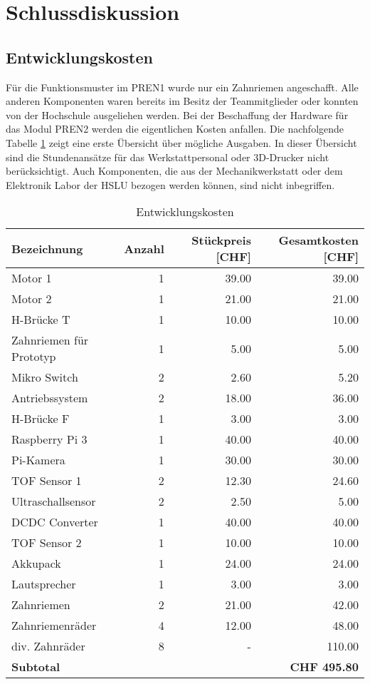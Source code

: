 \newpage
\section{Schlussdiskussion}
\subsection{Entwicklungskosten}
Für die Funktionsmuster im PREN1 wurde nur ein Zahnriemen angeschafft. Alle anderen Komponenten waren bereits im Besitz der Teammitglieder oder konnten von der Hochschule ausgeliehen werden. Bei der Beschaffung der Hardware für das Modul PREN2 werden die eigentlichen Kosten anfallen. Die nachfolgende Tabelle \ref{tab:kosten} zeigt eine erste Übersicht über mögliche Ausgaben. In dieser Übersicht sind die Stundenansätze für das Werkstattpersonal oder 3D-Drucker nicht berücksichtigt. Auch Komponenten, die aus der Mechanikwerkstatt oder dem Elektronik Labor der HSLU bezogen werden können, sind nicht inbegriffen.

\begin{center}
\centering
\begin{table}[H]
\begin{tabular}{|l|r|r|r|}
\hline 
\textbf{Bezeichnung} & \textbf{Anzahl} &
\textbf{Stückpreis [CHF]} & \textbf{Gesamtkosten [CHF]} \\
\hline 
Motor 1 & 1 & 39.00 & 39.00 \\
\hline
Motor 2 & 1 & 21.00 & 21.00 \\
\hline
H-Brücke T & 1 & 10.00 & 10.00\\
\hline
Zahnriemen für Prototyp & 1 & 5.00 & 5.00 \\
\hline
Mikro Switch & 2 & 2.60  & 5.20\\
\hline
Antriebssystem & 2 & 18.00  & 36.00\\
\hline
H-Brücke F & 1 & 3.00 & 3.00 \\
\hline
Raspberry Pi 3 & 1 & 40.00 & 40.00 \\
\hline
Pi-Kamera & 1 & 30.00 & 30.00 \\
\hline
TOF Sensor 1 & 2 & 12.30 & 24.60 \\
\hline
Ultraschallsensor & 2 & 2.50 & 5.00 \\
\hline
DCDC Converter & 1 & 40.00 & 40.00 \\
\hline
TOF Sensor 2 & 1 & 10.00 & 10.00 \\
\hline
Akkupack & 1 & 24.00  & 24.00 \\
\hline
Lautsprecher & 1 & 3.00 & 3.00\\
\hline 
Zahnriemen & 2 & 21.00 & 42.00\\
\hline
Zahnriemenräder & 4 & 12.00 & 48.00\\
\hline
div. Zahnräder & 8 & - & 110.00\\
\hline \hline 
 \textbf{Subtotal} &&& \textbf{CHF 495.80}\\
\hline 
\end{tabular}
\caption[Entwicklungskosten]{Entwicklungskosten}
\label{tab:kosten}
\end{table}
\end{center}

